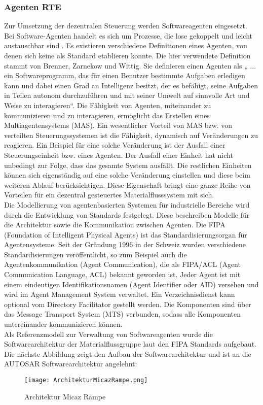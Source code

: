 \subsubsection{Agenten RTE}

Zur Umsetzung der dezentralen Steuerung werden Softwareagenten eingesetzt. Bei Software-Agenten handelt es sich um Prozesse, die lose gekoppelt 
und leicht austauschbar sind \cite[vgl.][S. 31-37]{GH:2010}. Es existieren verschiedene Definitionen eines Agenten, von denen
sich keine als Standard etablieren konnte. Die hier verwendete Definition stammt von
Brenner, Zarnekow und Wittig. Sie definieren einen Agenten als „ ... ein Softwareprogramm,
das für einen Benutzer bestimmte Aufgaben erledigen kann und dabei einen Grad an
Intelligenz besitzt, der es befähigt, seine Aufgaben in Teilen autonom durchzuführen und mit
seiner Umwelt auf sinnvolle Art und Weise zu interagieren“\cite{BZW:1998}. Die Fähigkeit von Agenten, miteinander zu kommunizieren 
und zu interagieren, ermöglicht das Erstellen eines Multiagentensystems (MAS). Ein wesentlicher Vorteil von MAS 
bzw. von verteilten Steuerungssystemen ist die Fähigkeit, dynamisch auf Veränderungen zu reagieren. Ein Beispiel für eine solche Veränderung ist der
Ausfall einer Steuerungseinheit bzw. eines Agenten. Der Ausfall einer Einheit hat nicht unbedingt zur Folge, dass das gesamte System ausfällt. 
Die restlichen Einheiten können sich eigenständig auf eine solche Veränderung einstellen und diese beim weiteren Ablauf
berücksichtigen\cite[S. 13]{Roidl:2012}. Diese Eigenschaft bringt eine ganze Reihe von Vorteilen für ein dezentral
gesteuertes Materialflusssystem mit sich.\\
Die Modellierung von agentenbasierten Systemen für industrielle Bereiche wird durch die
Entwicklung von Standards festgelegt. Diese beschreiben Modelle für die Architektur
sowie die Kommunikation zwischen Agenten. Die FIPA (Foundation of Intelligent Physical Agents) ist das Standardisierungsorgan für Agentensysteme.
Seit der Gründung 1996 in der Schweiz wurden verschiedene Standardisierungen veröffentlicht, so zum Beispiel auch die Agentenkommunikation (Agent Communication), die als FIPA/ACL (Agent Communication Language, ACL) bekannt geworden ist. Jeder Agent ist mit einem eindeutigen
Identifikationsnamen (Agent Identifier oder AID) versehen und wird im Agent Management System verwaltet\cite[S. 24]{Roidl:2012}.
Ein Verzeichnisdienst kann optional vom Directory Facilitator gestellt
werden. Die Komponenten sind über das Message Transport System (MTS) verbunden,
sodass alle Komponenten untereinander kommunizieren können\cite[S. 24]{Roidl:2012}. \\
Als Referenzmodell zur Verwaltung von Softwareagenten wurde die Softwarearchitektur der Materialflussgruppe laut den FIPA Standards aufgebaut. 
Die nächste Abbildung zeigt den Aufbau der Softwarearchitektur und ist an die AUTOSAR Softwarearchitektur angelehnt:
\begin{figure}[h!]
	\centering
		\texttt{[image: ArchitekturMicazRampe.png]}
	\caption{Architektur Micaz Rampe\cite{Stasch:Hahn}}
	\label{ArchitekturMicazRampe}
\end{figure}

